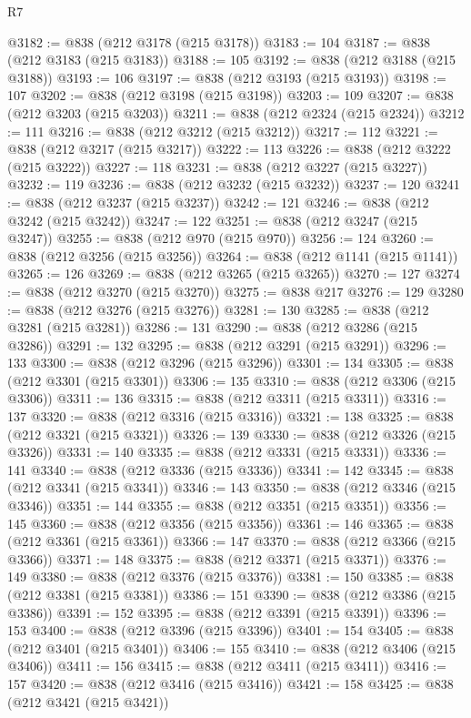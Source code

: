 \begin{lexlean}{R7}
\begin{coremodule}
@3182 := @838 (@212 @3178 (@215 @3178))
@3183 := 104
@3187 := @838 (@212 @3183 (@215 @3183))
@3188 := 105
@3192 := @838 (@212 @3188 (@215 @3188))
@3193 := 106
@3197 := @838 (@212 @3193 (@215 @3193))
@3198 := 107
@3202 := @838 (@212 @3198 (@215 @3198))
@3203 := 109
@3207 := @838 (@212 @3203 (@215 @3203))
@3211 := @838 (@212 @2324 (@215 @2324))
@3212 := 111
@3216 := @838 (@212 @3212 (@215 @3212))
@3217 := 112
@3221 := @838 (@212 @3217 (@215 @3217))
@3222 := 113
@3226 := @838 (@212 @3222 (@215 @3222))
@3227 := 118
@3231 := @838 (@212 @3227 (@215 @3227))
@3232 := 119
@3236 := @838 (@212 @3232 (@215 @3232))
@3237 := 120
@3241 := @838 (@212 @3237 (@215 @3237))
@3242 := 121
@3246 := @838 (@212 @3242 (@215 @3242))
@3247 := 122
@3251 := @838 (@212 @3247 (@215 @3247))
@3255 := @838 (@212 @970 (@215 @970))
@3256 := 124
@3260 := @838 (@212 @3256 (@215 @3256))
@3264 := @838 (@212 @1141 (@215 @1141))
@3265 := 126
@3269 := @838 (@212 @3265 (@215 @3265))
@3270 := 127
@3274 := @838 (@212 @3270 (@215 @3270))
@3275 := @838 @217
@3276 := 129
@3280 := @838 (@212 @3276 (@215 @3276))
@3281 := 130
@3285 := @838 (@212 @3281 (@215 @3281))
@3286 := 131
@3290 := @838 (@212 @3286 (@215 @3286))
@3291 := 132
@3295 := @838 (@212 @3291 (@215 @3291))
@3296 := 133
@3300 := @838 (@212 @3296 (@215 @3296))
@3301 := 134
@3305 := @838 (@212 @3301 (@215 @3301))
@3306 := 135
@3310 := @838 (@212 @3306 (@215 @3306))
@3311 := 136
@3315 := @838 (@212 @3311 (@215 @3311))
@3316 := 137
@3320 := @838 (@212 @3316 (@215 @3316))
@3321 := 138
@3325 := @838 (@212 @3321 (@215 @3321))
@3326 := 139
@3330 := @838 (@212 @3326 (@215 @3326))
@3331 := 140
@3335 := @838 (@212 @3331 (@215 @3331))
@3336 := 141
@3340 := @838 (@212 @3336 (@215 @3336))
@3341 := 142
@3345 := @838 (@212 @3341 (@215 @3341))
@3346 := 143
@3350 := @838 (@212 @3346 (@215 @3346))
@3351 := 144
@3355 := @838 (@212 @3351 (@215 @3351))
@3356 := 145
@3360 := @838 (@212 @3356 (@215 @3356))
@3361 := 146
@3365 := @838 (@212 @3361 (@215 @3361))
@3366 := 147
@3370 := @838 (@212 @3366 (@215 @3366))
@3371 := 148
@3375 := @838 (@212 @3371 (@215 @3371))
@3376 := 149
@3380 := @838 (@212 @3376 (@215 @3376))
@3381 := 150
@3385 := @838 (@212 @3381 (@215 @3381))
@3386 := 151
@3390 := @838 (@212 @3386 (@215 @3386))
@3391 := 152
@3395 := @838 (@212 @3391 (@215 @3391))
@3396 := 153
@3400 := @838 (@212 @3396 (@215 @3396))
@3401 := 154
@3405 := @838 (@212 @3401 (@215 @3401))
@3406 := 155
@3410 := @838 (@212 @3406 (@215 @3406))
@3411 := 156
@3415 := @838 (@212 @3411 (@215 @3411))
@3416 := 157
@3420 := @838 (@212 @3416 (@215 @3416))
@3421 := 158
@3425 := @838 (@212 @3421 (@215 @3421))

\end{coremodule}
\end{lexlean}
